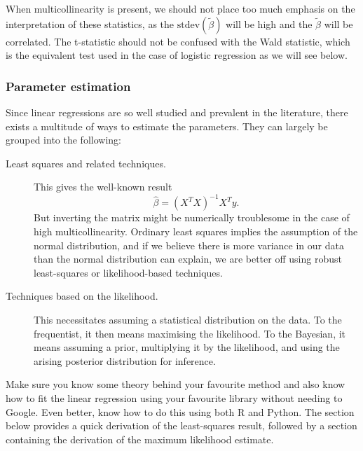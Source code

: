 \documentclass[a4paper]{article}
\begin{document}
When multicollinearity is present, we should not place too much emphasis on the interpretation of these statistics, as the  $\text{stdev}( \tilde\beta) $ will be high and the $\tilde\beta$ will be correlated. The t-statistic should not be confused with the Wald statistic, which is the equivalent test used in the case of logistic regression as we will see below.

\subsubsection{Parameter estimation}
Since linear regressions are so well studied and prevalent in the literature, there exists a multitude of ways to estimate the parameters.
They can largely be grouped into the following:
\begin{description}
  \item[Least squares and related techniques.] This gives the well-known result
  \[
    \hat{\beta} = (X^T X)^{-1}X^T y
    \text{.}
  \]
  But inverting the matrix might be numerically troublesome in the case of high multicollinearity.
  Ordinary least squares implies the assumption of the normal distribution, and if we believe there is more variance in our data than the normal distribution can explain, we are better off using robust least-squares or likelihood-based techniques.
  \item[Techniques based on the likelihood.]
  This necessitates assuming a statistical distribution on the data.
  To the frequentist, it then means maximising the likelihood.
  To the Bayesian, it means assuming a prior, multiplying it by the likelihood, and using the arising posterior distribution for inference.
\end{description}
Make sure you know some theory behind your favourite method and also know how to fit the linear regression using your favourite library without needing to Google.
Even better, know how to do this using both R and Python.
The section below provides a quick derivation of the least-squares result, followed by a section containing the derivation of the maximum likelihood estimate.
\end{document}
